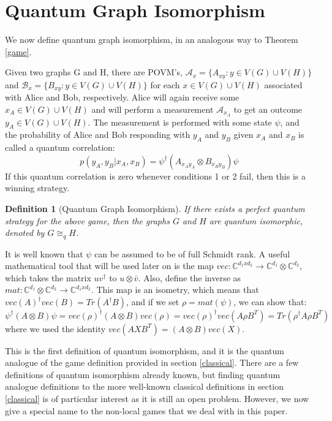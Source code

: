 \documentclass[12pt]{article}
\newtheorem{defn}[thm]{Definition}
\begin{document}
\section{Quantum Graph Isomorphism}
We now define quantum graph isomorphism, in an analogous way to Theorem \ref{game}. 

Given two graphs G and H, there are POVM's, $\mathcal{A}_x = \{A_{xy}: y \in V(G) \cup V(H)\}$ and $\mathcal{B}_x = \{B_{xy}: y \in V(G) \cup V(H)\}$ for each $x \in V(G) \cup V(H)$ associated with Alice and Bob, respectively.
Alice will again receive some $x_A \in V(G) \cup V(H)$ and will perform a measurement $\mathcal{A}_{x_A}$ to get an outcome $y_A \in V(G) \cup V(H)$.
The measurement is performed with some state $\psi$, and the probability of Alice and Bob responding with $y_A$ and $y_B$ given $x_A$ and $x_B$ is called a quantum correlation: 
\begin{equation}
p(y_A, y_B|x_A, x_B) = \psi^\dag(A_{x_Ay_A}\otimes B_{x_By_B})\psi
\end{equation}
If this quantum correlation is zero whenever conditions 1 or 2 fail, then this is a winning strategy.

\begin{defn}[Quantum Graph Isomorphism]
\label{qgame}
If there exists a perfect quantum strategy for the above game, then the graphs $G$ and $H$ are quantum isomorphic, denoted by $G \cong_q H$.
\end{defn}

It is well known that $\psi$ can be assumed to be of full Schmidt rank. A useful mathematical tool that will be used later on is the map $vec: \mathbb{C}^{d_1 x d_2} \longrightarrow \mathbb{C}^{d_1} \otimes \mathbb{C}^{d_2}$, which takes the matrix $uv^{\dag}$ to $u\otimes \bar{v}$. Also, define the inverse as $mat: \mathbb{C}^{d_1} \otimes \mathbb{C}^{d_2} \longrightarrow \mathbb{C}^{d_1 x d_2}$. This map is an isometry, which means that $vec(A)^{\dag}vec(B) = Tr(A^{\dag}B)$, and if we set $\rho = mat(\psi)$, we can show that: 
\begin{equation}
\label{isometry}
\psi^{\dag} (A \otimes B) \psi = vec(\rho)^{\dag} (A \otimes B) vec(\rho) = vec(\rho)^{\dag} vec(A \rho B^T) = Tr(\rho^{\dag} A\rho B^T)
\end{equation}
where we used the identity $vec(AXB^T) = (A \otimes B)vec(X)$.

This is the first definition of quantum isomorphism, and it is the quantum analogue of the game definition provided in section \ref{classical}. There are a few definitions of quantum isomorphism already known, but finding quantum analogue definitions to the more well-known classical definitions in section \ref{classical} is of particular interest as it is still an open problem. However, we now give a special name to the non-local games that we deal with in this paper.
\end{document}
